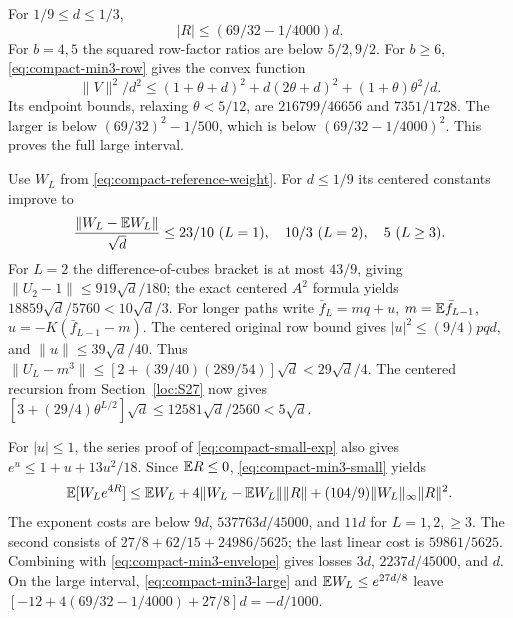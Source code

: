 For $1/9\le d\le1/3$,
\begin{equation}\label{eq:compact-min3-large}
 |R|\le(69/32-1/4000)d.
\end{equation}
For $b=4,5$ the squared row-factor ratios are below $5/2,9/2$.
For $b\ge6$, \eqref{eq:compact-min3-row} gives the convex function
\[
 \|V\|^2/d^2\le(1+\theta+d)^2+d(2\theta+d)^2
                         +(1+\theta)\theta^2/d.
\]
Its endpoint bounds, relaxing $\theta<5/12$, are $216799/46656$ and
$7351/1728$. The larger is below $(69/32)^2-1/500$, which is below
$(69/32-1/4000)^2$. This proves the full large interval.

Use $W_L$ from \eqref{eq:compact-reference-weight}.
For $d\le1/9$ its centered constants improve to
\begin{equation}\label{eq:compact-min3-weights}
 \frac{\|W_L-\mathbb E W_L\|}{\sqrt d}\le
 23/10\ (L=1),\quad10/3\ (L=2),\quad5\ (L\ge3).
\end{equation}
For $L=2$ the difference-of-cubes bracket is at most $43/9$,
giving $\|U_2-1\|\le919\sqrt d/180$; the exact centered $A^2$
formula yields $18859\sqrt d/5760<10\sqrt d/3$.
For longer paths write $\bar f_{L}=mq+u$, $m=\mathbb E \bar f_{L-1}$,
$u=-K(\bar f_{L-1}-m)$. The centered original row bound gives
$|u|^2\le(9/4)pqd$, and $\|u\|\le39\sqrt d/40$.
Thus
$\|U_L-m^3\|\le[2+(39/40)(289/54)]\sqrt d<29\sqrt d/4$.
The centered recursion from Section~\ref{loc:S27} now gives
$[3+(29/4)\theta^{L/2}]\sqrt d\le12581\sqrt d/2560<5\sqrt d$.

For $|u|\le1$, the series proof of \eqref{eq:compact-small-exp}
also gives $e^u\le1+u+13u^2/18$.
Since $\mathbb E R\le0$, \eqref{eq:compact-min3-small} yields
\[
 \mathbb E[W_Le^{4R}]\le\mathbb E W_L+4\|W_L-\mathbb E W_L\|\|R\|
                                +(104/9)\|W_L\|_\infty\|R\|^2.
\]
The exponent costs are below $9d$, $537763d/45000$, and $11d$ for
$L=1,2,\ge3$. The second consists of
$27/8+62/15+24986/5625$; the last linear cost is $59861/5625$.
Combining with \eqref{eq:compact-min3-envelope} gives losses
$3d$, $2237d/45000$, and $d$.
On the large interval, \eqref{eq:compact-min3-large} and
$\mathbb E W_L\le e^{27d/8}$ leave
$[-12+4(69/32-1/4000)+27/8]d=-d/1000$.

